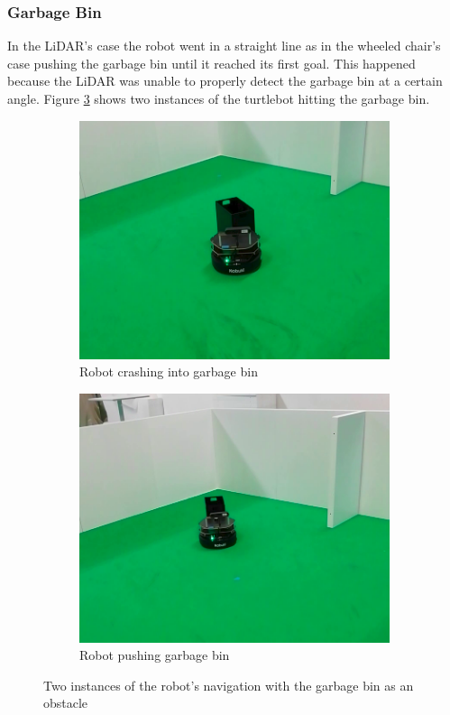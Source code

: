 \subsubsection{Garbage Bin}


In the  \ac{LiDAR}'s case the robot went in a straight line as in the wheeled chair's case pushing the garbage bin until it reached its first goal. This happened because the \ac{LiDAR} was unable to properly detect the garbage bin at a certain angle.  Figure \ref{fig:garbageLF} shows two instances of the turtlebot hitting the garbage bin.
\begin{figure}[ht!]
  \centering
  \begin{subfigure}[b]{0.49\linewidth}
    \includegraphics[width=\linewidth]{imgs/chapter5/garbageLF.png}
     \caption{Robot crashing into garbage bin}
     \label{fig:garbageLF1}
  \end{subfigure}
  \begin{subfigure}[b]{0.47\linewidth}
    \includegraphics[width=\linewidth]{imgs/chapter5/garbageLF2.png}
    \caption{Robot pushing garbage bin}
    \label{fig:garbageLF2}
  \end{subfigure}
  \caption{Two instances of the robot's navigation with the garbage bin as an obstacle}
  \label{fig:garbageLF}
\end{figure}


